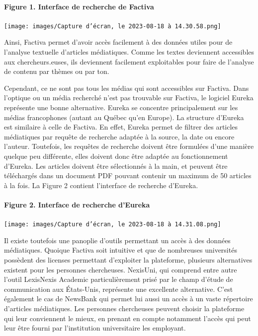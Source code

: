 \documentclass[
  letterpaper,
]{scrbook}
\let\oldparagraph\paragraph
\renewcommand{\paragraph}[1]{\oldparagraph{#1}\mbox{}}
\begin{document}
\hypertarget{figure-1.-interface-de-recherche-de-factiva}{%
\paragraph{Figure 1. Interface de recherche de
Factiva}\label{figure-1.-interface-de-recherche-de-factiva}}

\texttt{[image: images/Capture d’écran, le 2023-08-18 à 14.30.58.png]}

Ainsi, Factiva permet d'avoir accès facilement à des données utiles pour
de l'analyse textuelle d'articles médiatiques. Comme les textes
deviennent accessibles aux chercheurs.euses, ils deviennent facilement
exploitables pour faire de l'analyse de contenu par thèmes ou par ton.

Cependant, ce ne sont pas tous les médias qui sont accessibles sur
Factiva. Dans l'optique ou un média recherché n'est pas trouvable sur
Factiva, le logiciel Eureka représente une bonne alternative. Eureka se
concentre principalement sur les médias francophones (autant au Québec
qu'en Europe). La structure d'Eureka est similaire à celle de Factiva.
En effet, Eureka permet de filtrer des articles médiatiques par requête
de recherche adaptée à la source, la date ou encore l'auteur. Toutefois,
les requêtes de recherche doivent être formulées d'une manière quelque
peu différente, elles doivent donc être adaptée au fonctionnement
d'Eureka. Les articles doivent être sélectionnés à la main, et peuvent
être téléchargés dans un document PDF pouvant contenir un maximum de 50
articles à la fois. La Figure 2 contient l'interface de recherche
d'Eureka.

\hypertarget{figure-2.-interface-de-recherche-deureka}{%
\paragraph{Figure 2. Interface de recherche
d'Eureka}\label{figure-2.-interface-de-recherche-deureka}}

\texttt{[image: images/Capture d’écran, le 2023-08-18 à 14.31.08.png]}

Il existe toutefois une panoplie d'outils permettant un accès à des
données médiatiques. Quoique Factiva soit intuitive et que de nombreuses
universités possèdent des licenses permettant d'exploiter la plateforme,
plusieurs alternatives existent pour les personnes chercheuses.
NexisUni, qui comprend entre autre l'outil LexisNexis Academic
particulièrement prisé par le champ d'étude de communication aux
États-Unis, représente une excellente alternative. C'est également le
cas de NewsBank qui permet lui aussi un accès à un vaste répertoire
d'articles médiatiques. Les personnes chercheuses peuvent choisir la
plateforme qui leur conviennent le mieux, en prenant en compte notamment
l'accès qui peut leur être fourni par l'institution universitaire les
employant.
\end{document}
